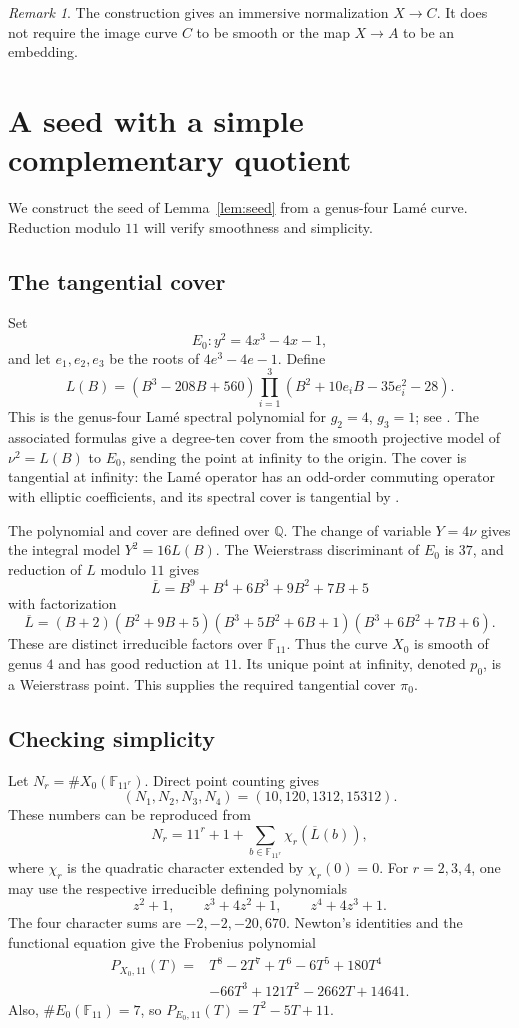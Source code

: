 \documentclass[11pt]{amsart}
\theoremstyle{remark}
\newtheorem{remark}[lemma]{Remark}
\newcommand{\Q}{\mathbb Q}
\numberwithin{equation}{section}
\begin{document}
\begin{remark}
The construction gives an immersive normalization $X\to C$. It does
not require the image curve $C$ to be smooth or the map $X\to A$ to be
an embedding.
\end{remark}

\appendix
\section{A seed with a simple complementary quotient}\label{app:seed}

We construct the seed of Lemma~\ref{lem:seed} from a genus-four
Lam\'e curve. Reduction modulo $11$ will verify smoothness and
simplicity.

\subsection{The tangential cover}
Set
\[
E_0:y^2=4x^3-4x-1,
\]
and let $e_1,e_2,e_3$ be the roots of $4e^3-4e-1$. Define
\[
L(B)=(B^3-208B+560)
\prod_{i=1}^3(B^2+10e_iB-35e_i^2-28).
\]
This is the genus-four Lam\'e spectral polynomial for $g_2=4$, $g_3=1$;
see \cite[Table~3 and Theorem~L]{maier}. The associated formulas give
a degree-ten cover from the smooth projective model of
$\nu^2=L(B)$ to $E_0$, sending the point at infinity to the origin.
The cover is tangential at infinity: the Lam\'e operator has an
odd-order commuting operator with elliptic coefficients, and its
spectral cover is tangential by \cite[Proposition~3.1 and the paragraph
after equation~(17)]{eilbeck}.

The polynomial and cover are defined over $\Q$. The change of variable
$Y=4\nu$ gives the integral model $Y^2=16L(B)$. The Weierstrass
discriminant of $E_0$ is $37$, and reduction of $L$ modulo $11$ gives
\[
\overline L=B^9+B^4+6B^3+9B^2+7B+5
\]
with factorization
\[
\overline L=(B+2)(B^2+9B+5)
(B^3+5B^2+6B+1)(B^3+6B^2+7B+6).
\]
These are distinct irreducible factors over $\mathbb F_{11}$. Thus
the curve $X_0$ is smooth of genus $4$ and has good reduction at $11$.
Its unique point at infinity, denoted $p_0$, is a Weierstrass point.
This supplies the required tangential cover $\pi_0$.

\subsection{Checking simplicity}
Let $N_r=\#X_0(\mathbb F_{11^r})$. Direct point counting gives
\[
(N_1,N_2,N_3,N_4)=(10,120,1312,15312).
\]
These numbers can be reproduced from
\[
N_r=11^r+1+\sum_{b\in\mathbb F_{11^r}}\chi_r(\overline L(b)),
\]
where $\chi_r$ is the quadratic character extended by $\chi_r(0)=0$.
For $r=2,3,4$, one may use the respective irreducible defining
polynomials
\[
z^2+1,\qquad z^3+4z^2+1,\qquad z^4+4z^3+1.
\]
The four character sums are $-2,-2,-20,670$. Newton's identities and
the functional equation give the Frobenius polynomial
\[
\begin{split}
P_{X_0,11}(T)={}&T^8-2T^7+T^6-6T^5+180T^4\\
&-66T^3+121T^2-2662T+14641.
\end{split}
\]
Also, $\#E_0(\mathbb F_{11})=7$, so
$P_{E_0,11}(T)=T^2-5T+11$.
\end{document}

